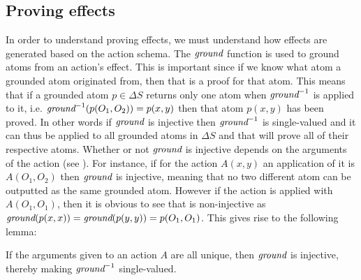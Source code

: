 \documentclass[../Master.tex]{subfiles}
\begin{document}
\subsection{Proving effects}
In order to understand proving effects, we must understand how effects are generated based on the action schema.
The $\textit{ground}$ function is used to ground atoms from an action's effect. This is important since if we know what atom a grounded atom originated from, then that is a proof for that atom. This means that if a grounded atom $p \in \Delta S$ returns only one atom when $\textit{ground} ^{-1}$ is applied to it, i.e. $\textit{ground} ^{-1}(p(O_1,O_2)) = {p(x,y)}$ then that atom $p(x,y)$ has been proved. In other words if $\textit{ground}$ is injective then $\textit{ground} ^{-1}$ is single-valued and it can thus be applied to all grounded atoms in $\Delta S$ and that will prove all of their respective atoms.
Whether or not $\textit{ground}$ is injective depends on the arguments of the action (see ).
For instance, if for the action $A(x,y)$ an application of it is $A(O_1,O_2)$ then $\textit{ground}$ is injective, meaning that no two different atom can be outputted as the same grounded atom. However if the action is applied with $A(O_1,O_1)$, then it is obvious to see that \ground is non-injective as $\textit{ground}(p(x,x))=\textit{ground}(p(y,y))=p(O_1,O_1)$.
This gives rise to the following lemma:
\begin{lemma}
If the arguments given to an action $A$ are all unique, then $\textit{ground}$ is injective, thereby making $\textit{ground} ^{-1}$ single-valued.
\end{lemma}
\end{document}
